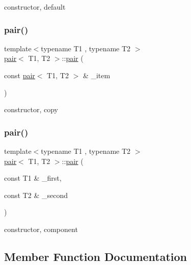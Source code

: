 constructor, default 

\mbox{\label{structpair_ab75f77e9a1f726301f66d3be6b1e184a}} 
\subsubsection{\texorpdfstring{pair()}{pair()}\hspace{0.1cm}{\footnotesize\ttfamily [2/3]}}
{\footnotesize\ttfamily template$<$typename T1 , typename T2 $>$ \\
\hyperlink{structpair}{pair}$<$ T1, T2 $>$\+::\hyperlink{structpair}{pair} (\begin{DoxyParamCaption}\item[{const \hyperlink{structpair}{pair}$<$ T1, T2 $>$ \&}]{\+\_\+item }\end{DoxyParamCaption})\hspace{0.3cm}{\ttfamily [inline]}}



constructor, copy 

\mbox{\label{structpair_a5674a7a5327419692abe6160ae202859}} 
\subsubsection{\texorpdfstring{pair()}{pair()}\hspace{0.1cm}{\footnotesize\ttfamily [3/3]}}
{\footnotesize\ttfamily template$<$typename T1 , typename T2 $>$ \\
\hyperlink{structpair}{pair}$<$ T1, T2 $>$\+::\hyperlink{structpair}{pair} (\begin{DoxyParamCaption}\item[{const T1 \&}]{\+\_\+first,  }\item[{const T2 \&}]{\+\_\+second }\end{DoxyParamCaption})\hspace{0.3cm}{\ttfamily [inline]}}



constructor, component 



\subsection{Member Function Documentation}
\mbox{\label{structpair_a89b59c46e545a619e96c7bd5d66a8ef6}} 
